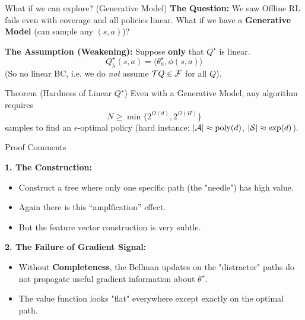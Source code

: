 \documentclass[aspectratio=169]{beamer}
\begin{document}
\begin{frame}{What if we can explore? (Generative Model)}
    \textbf{The Question:}
    We saw Offline RL fails even with coverage and all policies linear. 
    What if we have a \textbf{Generative Model} (can sample any $(s,a)$)?
    
    \vspace{0.2cm}
    
\pause    \textbf{The Assumption (Weakening):}
    Suppose \textbf{only} that $Q^\star$ is linear.
    \[
    Q^\star_h(s,a) = \langle \theta^\star_h, \phi(s,a) \rangle
    \]
    (So no linear BC, i.e. we do \emph{not} assume $\mathcal{T} Q \in \mathcal{F}$
    for all $Q$).

    \vspace{0.3cm}
\pause    \begin{block}{Theorem (Hardness of Linear $Q^\star$)}
    Even with a Generative Model, any algorithm requires
    \[
    N \ge \min \{ 2^{\Omega(d)}, 2^{\Omega(H)} \}
    \]
    samples to find an $\epsilon$-optimal policy (hard instance:
    $|\mathcal{A}| \approx \text{poly}(d)$, $|\mathcal{S}| \approx \text{exp}(d)$).
    \end{block}
\end{frame}

\begin{frame}{Proof Comments}
    
    \textbf{1. The Construction:}
    
    \begin{itemize}
        \item Construct a tree where only one specific path (the "needle") has high value.
        \item Again there is this ``amplfication'' effect.
        \item But the feature vector construction is very subtle.
    \end{itemize}

    \textbf{2. The Failure of Gradient Signal:}
    \begin{itemize}
        \item Without \textbf{Completeness}, the Bellman updates on the "distractor" paths do not propagate useful gradient information about $\theta^\star$.
        \item The value function looks "flat" everywhere except exactly on the optimal path.
    \end{itemize}
    
\end{frame}
\end{document}
